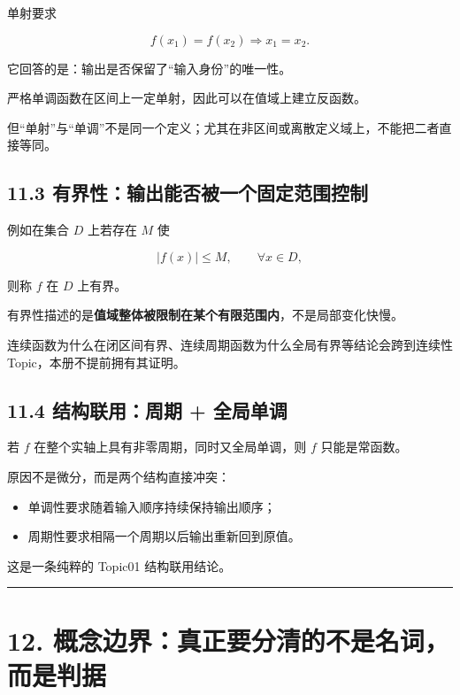 \documentclass[11pt,a4paper]{ctexart}
\providecommand{\tightlist}{}
\begin{document}
单射要求

\[
f(x_1)=f(x_2)\Longrightarrow x_1=x_2.
\]

它回答的是：输出是否保留了``输入身份''的唯一性。

严格单调函数在区间上一定单射，因此可以在值域上建立反函数。

但``单射''与``单调''不是同一个定义；尤其在非区间或离散定义域上，不能把二者直接等同。

\subsection{11.3
有界性：输出能否被一个固定范围控制}\label{ux6709ux754cux6027ux8f93ux51faux80fdux5426ux88abux4e00ux4e2aux56faux5b9aux8303ux56f4ux63a7ux5236}

例如在集合 \(D\) 上若存在 \(M\) 使

\[
|f(x)|\le M,\qquad \forall x\in D,
\]

则称 \(f\) 在 \(D\) 上有界。

有界性描述的是\textbf{值域整体被限制在某个有限范围内}，不是局部变化快慢。

连续函数为什么在闭区间有界、连续周期函数为什么全局有界等结论会跨到连续性
Topic，本册不提前拥有其证明。

\subsection{11.4 结构联用：周期 +
全局单调}\label{ux7ed3ux6784ux8054ux7528ux5468ux671f-ux5168ux5c40ux5355ux8c03}

若 \(f\) 在整个实轴上具有非零周期，同时又全局单调，则 \(f\)
只能是常函数。

原因不是微分，而是两个结构直接冲突：

\begin{itemize}
\tightlist
\item
  单调性要求随着输入顺序持续保持输出顺序；
\item
  周期性要求相隔一个周期以后输出重新回到原值。
\end{itemize}

这是一条纯粹的 Topic01 结构联用结论。

\begin{center}\rule{0.5\linewidth}{0.5pt}\end{center}

\section{12.
概念边界：真正要分清的不是名词，而是判据}\label{ux6982ux5ff5ux8fb9ux754cux771fux6b63ux8981ux5206ux6e05ux7684ux4e0dux662fux540dux8bcdux800cux662fux5224ux636e}
\end{document}
